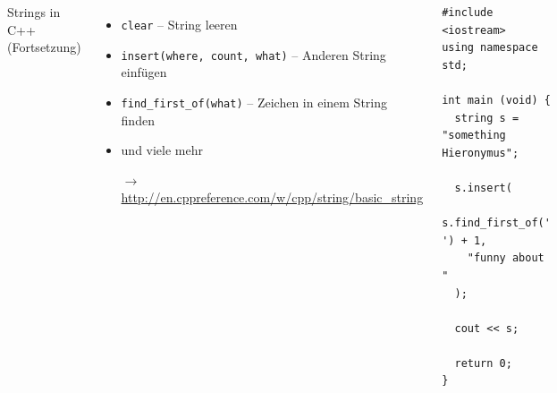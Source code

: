 \begin{frame}[fragile]
%
\begin{columns}[T]
\begin{Large}
{Strings in C++ (Fortsetzung)}
\vspace{10pt}
\end{Large}
%
\begin{itemize}
\item \texttt{clear} -- String leeren
\item \texttt{insert(where, count, what)} -- Anderen String einfügen
\item \texttt{find\_first\_of(what)} -- Zeichen in einem String finden
\item und viele mehr
\item[$\rightarrow$] \url{http://en.cppreference.com/w/cpp/string/basic_string}
\end{itemize}
%
\begin{codebox}
\begin{verbatim}
#include <iostream>
using namespace std;

int main (void) {
  string s = "something Hieronymus";
  
  s.insert(
    s.find_first_of(' ') + 1,
    "funny about "
  );
  
  cout << s;
  
  return 0;
}
\end{verbatim}
\end{codebox}
\end{columns}
%
\end{frame}


